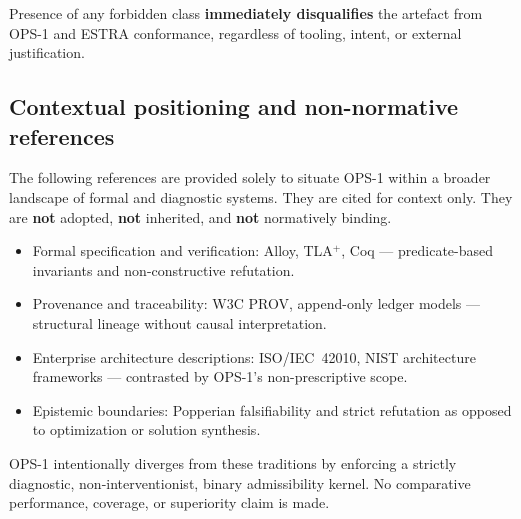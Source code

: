 Presence of any forbidden class
\textbf{immediately disqualifies}
the artefact from OPS-1
and ESTRA conformance,
regardless of tooling,
intent,
or external justification.

\subsection{Contextual positioning and non-normative references}

The following references are provided solely to situate OPS-1
within a broader landscape of formal and diagnostic systems.
They are cited for context only.
They are \textbf{not} adopted,
\textbf{not} inherited,
and \textbf{not} normatively binding.

\begin{itemize}
  \item Formal specification and verification:
        Alloy, TLA$^{+}$, Coq — predicate-based invariants
        and non-constructive refutation.
  \item Provenance and traceability:
        W3C PROV, append-only ledger models — structural lineage
        without causal interpretation.
  \item Enterprise architecture descriptions:
        ISO/IEC~42010, NIST architecture frameworks —
        contrasted by OPS-1’s non-prescriptive scope.
  \item Epistemic boundaries:
        Popperian falsifiability and strict refutation
        as opposed to optimization or solution synthesis.
\end{itemize}

OPS-1 intentionally diverges from these traditions
by enforcing a strictly diagnostic,
non-interventionist,
binary admissibility kernel.
No comparative performance,
coverage,
or superiority claim is made.
